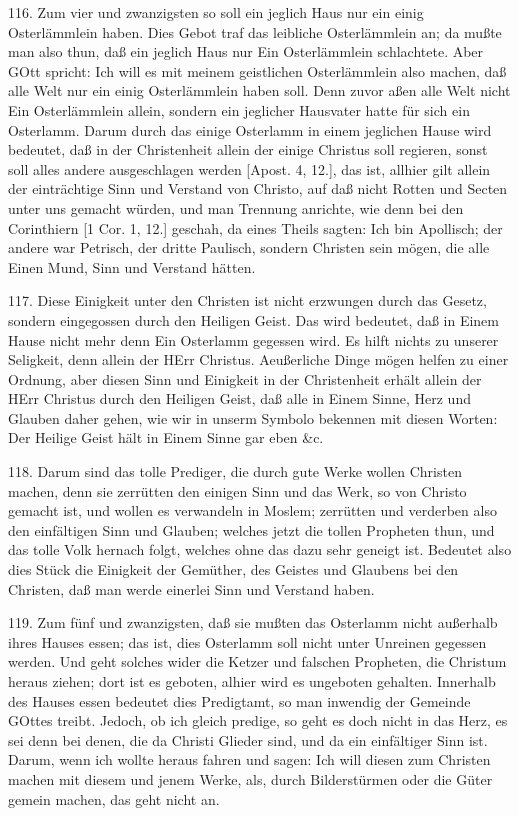 116. Zum vier und zwanzigsten so soll ein jeglich Haus nur ein einig Osterlämmlein haben. Dies Gebot traf das leibliche Osterlämmlein an; da mußte man also thun, daß ein jeglich Haus nur Ein Osterlämmlein schlachtete. Aber GOtt spricht: Ich will es mit meinem geistlichen Osterlämmlein also machen, daß alle Welt nur ein einig Osterlämmlein haben soll. Denn zuvor aßen alle Welt nicht Ein Osterlämmlein allein, sondern ein jeglicher Hausvater hatte für sich ein Osterlamm. Darum durch das einige Osterlamm in einem jeglichen Hause wird bedeutet, daß in der Christenheit allein der einige Christus soll regieren, sonst soll alles andere ausgeschlagen werden [Apost. 4, 12.], das ist, allhier gilt allein der einträchtige Sinn und Verstand von Christo, auf daß nicht Rotten und Secten unter uns gemacht würden, und man Trennung anrichte, wie denn bei den Corinthiern [1 Cor. 1, 12.] geschah, da eines Theils sagten: Ich bin Apollisch; der andere war Petrisch, der dritte Paulisch, sondern Christen sein mögen, die alle Einen Mund, Sinn und Verstand hätten.

117. Diese Einigkeit unter den Christen ist nicht erzwungen durch das Gesetz, sondern eingegossen durch den Heiligen Geist. Das wird bedeutet, daß in Einem Hause nicht mehr denn Ein Osterlamm gegessen wird. Es hilft nichts zu unserer Seligkeit, denn allein der HErr Christus. Aeußerliche Dinge mögen helfen zu einer Ordnung, aber diesen Sinn und Einigkeit in der Christenheit erhält allein der HErr Christus durch den Heiligen Geist, daß alle in Einem Sinne, Herz und Glauben daher gehen, wie wir in unserm Symbolo bekennen mit diesen Worten: Der Heilige Geist hält in Einem Sinne gar eben \&c.

118. Darum sind das tolle Prediger, die durch gute Werke wollen Christen machen, denn sie zerrütten den einigen Sinn und das Werk, so von Christo gemacht ist, und wollen es verwandeln in Moslem; zerrütten und verderben also den einfältigen Sinn und Glauben; welches jetzt die tollen Propheten thun, und das tolle Volk hernach folgt, welches ohne das dazu sehr geneigt ist. Bedeutet also dies Stück die Einigkeit der Gemüther, des Geistes und Glaubens bei den Christen, daß man werde einerlei Sinn und Verstand haben.

119. Zum fünf und zwanzigsten, daß sie mußten das Osterlamm nicht außerhalb ihres Hauses essen; das ist, dies Osterlamm soll nicht unter Unreinen gegessen werden. Und geht solches wider die Ketzer und falschen Propheten, die Christum heraus ziehen; dort ist es geboten, alhier wird es ungeboten gehalten. Innerhalb des Hauses essen bedeutet dies Predigtamt, so man inwendig der Gemeinde GOttes treibt. Jedoch, ob ich gleich predige, so geht es doch nicht in das Herz, es sei denn bei denen, die da Christi Glieder sind, und da ein einfältiger Sinn ist. Darum, wenn ich wollte heraus fahren und sagen: Ich will diesen zum Christen machen mit diesem und jenem Werke, als, durch Bilderstürmen oder die Güter gemein machen, das geht nicht an.

